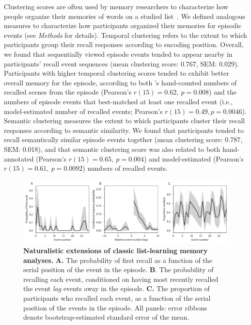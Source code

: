 \documentclass[10pt]{article}
\begin{document}
Clustering scores are often used by memory researchers to characterize how people organize their memories of words on a studied list~\citep[for review, see][]{PolyEtal09}.  We defined analogous measures to characterize how participants organized their memories for episodic events (see \textit{Methods} for details).  Temporal clustering refers to the extent to which participants group their recall responses according to encoding position.  Overall, we found that sequentially viewed episode events tended to appear nearby in participants' recall event sequences (mean clustering score: 0.767, SEM: 0.029).  Participants with higher temporal clustering scores tended to exhibit better overall memory for the episode, according to both \cite{ChenEtal17}'s hand-counted numbers of recalled scenes from the episode (Pearson's $r(15) = 0.62,~p = 0.008$) and the numbers of episode events that best-matched at least one recalled event (i.e., model-estimated number of recalled events; Pearson's $r(15) = 0.49, p = 0.0046$).  Semantic clustering measures the extent to which participants cluster their recall responses according to semantic similarity.  We found that participants tended to recall semantically similar episode events together (mean clustering score: 0.787, SEM: 0.018), and that semantic clustering score was also related to both hand-annotated  (Pearson's $r(15) = 0.65,~p = 0.004$) and model-estimated (Pearson's $r(15) = 0.61,~p = 0.0092$) numbers of recalled events.

\begin{figure}[tp]
  \centering
  \includegraphics[width=1\textwidth]{figs/list_learning}
  \caption{\small \textbf{Naturalistic extensions of classic list-learning memory analyses.} \textbf{A.} The probability of first recall as a function of the serial position of the event in the episode. \textbf{B}.  The probability of recalling each event, conditioned on having most recently recalled the event \textit{lag} events away in the episode.  \textbf{C.} The proportion of participants who recalled each event, as a function of the serial position of the events in the episode.  All panels: error ribbons denote bootstrap-estimated standard error of the mean.}
  \label{fig:list-learning}
\end{figure}
\end{document}
